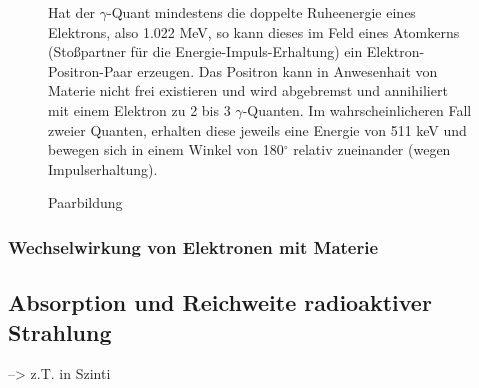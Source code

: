 \begin{figure}[H]
	\begin{minipage}{0.49\textwidth}
	\centering %
	\caption{Paarbildung}
	\end{minipage}
	\begin{minipage}{0.5\textwidth}
	Hat der $\gamma$-Quant mindestens die doppelte Ruheenergie eines Elektrons, also 1.022 MeV, so kann dieses im Feld eines Atomkerns (Stoßpartner für die Energie-Impuls-Erhaltung) ein Elektron-Positron-Paar erzeugen. Das Positron kann in Anwesenhait von Materie nicht frei existieren und wird abgebremst und annihiliert mit einem Elektron zu 2 bis 3 $\gamma$-Quanten. Im wahrscheinlicheren Fall zweier Quanten, erhalten diese jeweils eine Energie von 511 keV und bewegen sich in einem Winkel von 180$^\circ$ relativ zueinander (wegen Impulserhaltung).
	\end{minipage}
\end{figure}

\subsubsection{Wechselwirkung von Elektronen mit Materie}

\subsection{Absorption und Reichweite radioaktiver Strahlung}
 --> z.T. in Szinti

